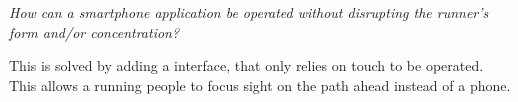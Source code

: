 \begin{center}
\textit{How can a smartphone application be operated without disrupting the runner's form and/or concentration?}
\end{center}
This is solved by adding a interface, that only relies on touch to be operated. This allows a running people to focus sight on the path ahead instead of a phone. 






